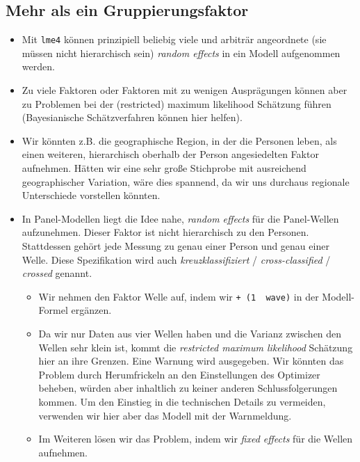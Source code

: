 \documentclass[
]{book}
\providecommand{\tightlist}{%
  \setlength{\itemsep}{0pt}\setlength{\parskip}{0pt}}
\begin{document}
\hypertarget{mehr-als-ein-gruppierungsfaktor}{%
\subsection*{Mehr als ein Gruppierungsfaktor}\label{mehr-als-ein-gruppierungsfaktor}}

\begin{itemize}
\tightlist
\item
  Mit \texttt{lme4} können prinzipiell beliebig viele und arbiträr angeordnete (sie müssen nicht hierarchisch sein) \emph{random effects} in ein Modell aufgenommen werden.
\item
  Zu viele Faktoren oder Faktoren mit zu wenigen Ausprägungen können aber zu Problemen bei der (restricted) maximum likelihood Schätzung führen (Bayesianische Schätzverfahren können hier helfen).
\item
  Wir könnten z.B. die geographische Region, in der die Personen leben, als einen weiteren, hierarchisch oberhalb der Person angesiedelten Faktor aufnehmen. Hätten wir eine sehr große Stichprobe mit ausreichend geographischer Variation, wäre dies spannend, da wir uns durchaus regionale Unterschiede vorstellen könnten.
\item
  In Panel-Modellen liegt die Idee nahe, \emph{random effects} für die Panel-Wellen aufzunehmen. Dieser Faktor ist nicht hierarchisch zu den Personen. Stattdessen gehört jede Messung zu genau einer Person und genau einer Welle. Diese Spezifikation wird auch \emph{kreuzklassifiziert} / \emph{cross-classified} / \emph{crossed} genannt.

  \begin{itemize}
  \tightlist
  \item
    Wir nehmen den Faktor Welle auf, indem wir \texttt{+\ (1\ \textbar{}\ wave)} in der Modell-Formel ergänzen.
  \item
    Da wir nur Daten aus vier Wellen haben und die Varianz zwischen den Wellen sehr klein ist, kommt die \emph{restricted maximum likelihood} Schätzung hier an ihre Grenzen. Eine Warnung wird ausgegeben. Wir könnten das Problem durch Herumfrickeln an den Einstellungen des Optimizer beheben, würden aber inhaltlich zu keiner anderen Schlussfolgerungen kommen. Um den Einstieg in die technischen Details zu vermeiden, verwenden wir hier aber das Modell mit der Warnmeldung.
  \item
    Im Weiteren lösen wir das Problem, indem wir \emph{fixed effects} für die Wellen aufnehmen.
  \end{itemize}
\end{itemize}
\end{document}
